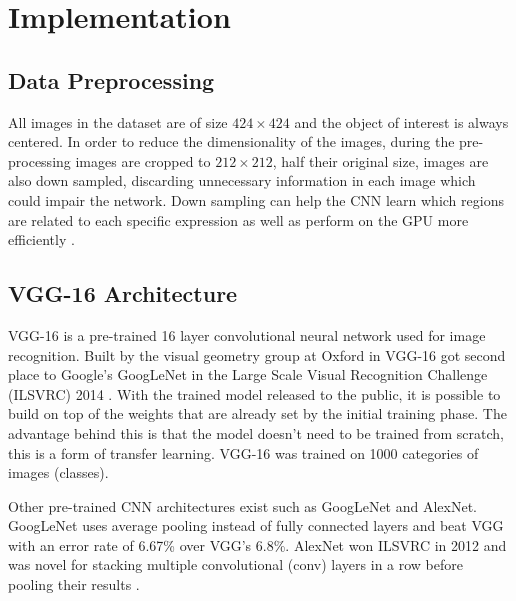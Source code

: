 \section{Implementation}


\subsection{Data Preprocessing}

All images in the dataset are of size $424\times424$ and the object of interest is always centered. In order to reduce the dimensionality of the images, during the pre-processing images are cropped to $212\times212$, half their original size, images are also down sampled, discarding unnecessary information in each image which could impair the network. Down sampling can help the CNN learn which regions are related to each specific expression as well as perform on the GPU more efficiently \cite{deep-learning-review}.

\subsection{VGG-16 Architecture}

\newcommand{\anet}{AlexNet\xspace}
\newcommand{\gnet}{GoogLeNet\xspace}
\newcommand{\inet}{ImageNet\xspace}

VGG-16 is a pre-trained 16 layer convolutional neural network used for image recognition. Built by the visual geometry group at Oxford in \citeyear{vgg16-arxiv} VGG-16 got second place to Google's \gnet in the Large Scale Visual Recognition Challenge (ILSVRC) 2014 \cite{vgg16-arxiv}. With the trained model released to the public, it is possible to build on top of the weights that are already set by the initial training phase. The advantage behind this is that the model doesn't need to be trained from scratch, this is a form of transfer learning. VGG-16 was trained on 1000 categories of images (classes).

Other pre-trained CNN architectures exist such as \gnet and \anet. \gnet uses average pooling instead of fully connected layers \cite{googlenet-paper} and beat VGG with an error rate of 6.67\% over VGG's 6.8\%. \anet won ILSVRC in 2012 and was novel for stacking multiple convolutional (conv) layers in a row before pooling their results \cite{alexnet-paper}. %

